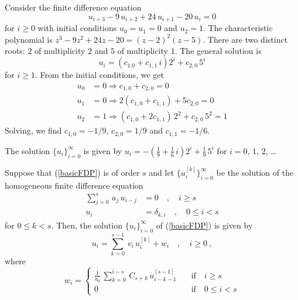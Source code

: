 \begin{egg}
Consider the finite difference equation
\[
u_{i+3} -9\,u_{i+2} +24\,u_{i+1} -20\,u_i = 0
\]
for $i\geq 0$ with initial conditions $u_0 = u_1 = 0$ and $u_2 = 1$.
The characteristic polynomial is $z^3 -9z^2 +24z -20 = (z-2)^2(z-5)$.
There are two distinct roots: $2$ of multiplicity $2$ and $5$ of
multiplicity $1$.  The general solution is
\[
u_i = (c_{1.0} + c_{1,1}\,i)2^i + c_{2,0}\,5^i
\]
for $i \geq 1$.  From the initial conditions, we get
\begin{align*}
u_0 &= 0 \Rightarrow c_{1,0}+c_{2,0} = 0 \\
u_1 &= 0 \Rightarrow 2(c_{1,0} +c_{1,1}) + 5 c_{2,0} = 0 \\
u_2 &= 1 \Rightarrow (c_{1,0}+ 2 c_{1,1})\,2^2 + c_{2,0}\,5^2 = 1
\end{align*}
Solving, we find $c_{1,0} = -1/9$, $c_{2,0} = 1/9$ and
$c_{1,1} = -1/6$.

The solution $\{u_i\}_{i=0}^\infty$ is given by
$\displaystyle u_i = -\left(\frac{1}{9}+\frac{1}{6}\,i\right)2^i +
\frac{1}{9}\,5^i$ for $i=0$, $1$, $2$, \ldots
\end{egg}

\begin{theorem}
Suppose that (\ref{basicFDP}) is of order $s$ and let
$\{ u_i^{[k]} \}_{i=0}^\infty$ be the solution of the homogeneous finite
difference equation 
\begin{align*}
\sum_{j=0}^s\,a_j\,u_{i-j} &= 0 \quad, \quad i \geq s \\
u_i &= \delta_{k,i} \quad, \quad 0 \leq i < s
\end{align*}
for $0 \leq k < s$.  Then, the solution $\{ u_i \}_{i=0}^\infty$ of
(\ref{basicFDP}) is given by
\begin{equation} \label{non_hom_solA}
u_i = \sum_{k=0}^{s-1}\,v_i\,u_i^{[k]} + w_i \quad, \quad i \geq 0 \ ,
\end{equation}
where
\begin{equation} \label{non_hom_solB}
w_i =  \begin{cases}
\displaystyle \frac{1}{a_0}\,\sum_{k=0}^{i-s}\,C_{s+k}\,u_{i-k-1}^{[s-1]} &
\quad \text{if} \quad i\geq s \\
0 & \quad \text{if} \quad 0 \leq i < s
\end{cases}
\end{equation}
\label{solNonHomFDP}
\end{theorem}

